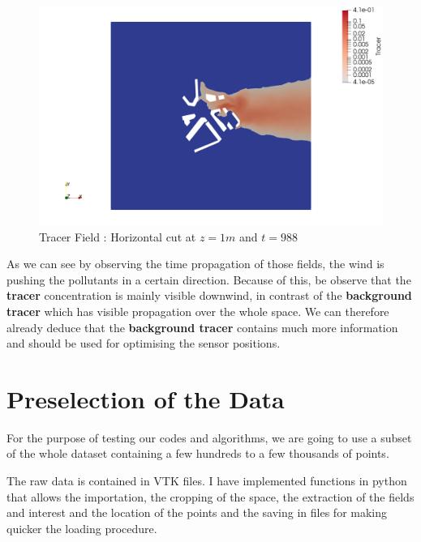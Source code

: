 \begin{figure}[h!]
\centering
  \includegraphics[width=0.9\linewidth]{figures/Analysis/tracer988cutZ1}
  \caption{Tracer Field : Horizontal cut at $z=1m$ and $t=988$}
  \label{fig:view:tracerend}
\end{figure}



As we can see by observing the time propagation of those fields,  the wind is pushing the pollutants in a certain direction. Because of this, be observe that the \textbf{tracer} concentration is mainly visible downwind, in contrast of the \textbf{background tracer} which has visible propagation over the whole space. We can therefore already deduce that the \textbf{background tracer} contains much more information and should be used for optimising the sensor positions. 




\section{Preselection of the Data} \label{sec:preselection}

For the purpose of testing our codes and algorithms,  we are going to use a subset of the whole dataset containing a few hundreds to a few thousands of points. 


The raw data is contained in VTK files. I have implemented functions in python that allows the importation, the cropping of the space, the extraction of the fields and interest and the location of the points and the saving in files for making quicker the loading procedure. 

